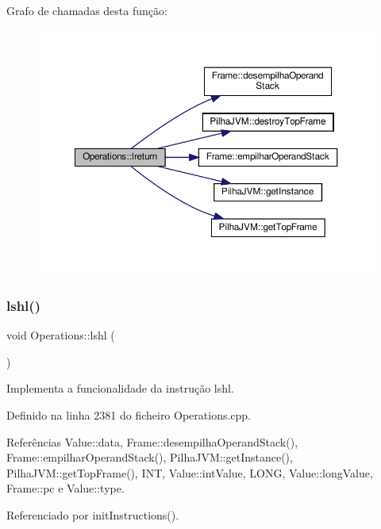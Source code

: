 Grafo de chamadas desta função\+:
\nopagebreak
\begin{figure}[H]
\begin{center}
\leavevmode
\includegraphics[width=350pt]{classOperations_adbc4db2dbfcae7185bc9b7a005e988ea_cgraph}
\end{center}
\end{figure}
\mbox{\label{classOperations_a9d2b2a5ea74f26e6a5005ec9e99b24d9}} 
\subsubsection{\texorpdfstring{lshl()}{lshl()}}
{\footnotesize\ttfamily void Operations\+::lshl (\begin{DoxyParamCaption}{ }\end{DoxyParamCaption})\hspace{0.3cm}{\ttfamily [private]}}



Implementa a funcionalidade da instrução lshl. 



Definido na linha 2381 do ficheiro Operations.\+cpp.



Referências Value\+::data, Frame\+::desempilha\+Operand\+Stack(), Frame\+::empilhar\+Operand\+Stack(), Pilha\+J\+V\+M\+::get\+Instance(), Pilha\+J\+V\+M\+::get\+Top\+Frame(), I\+NT, Value\+::int\+Value, L\+O\+NG, Value\+::long\+Value, Frame\+::pc e Value\+::type.



Referenciado por init\+Instructions().

